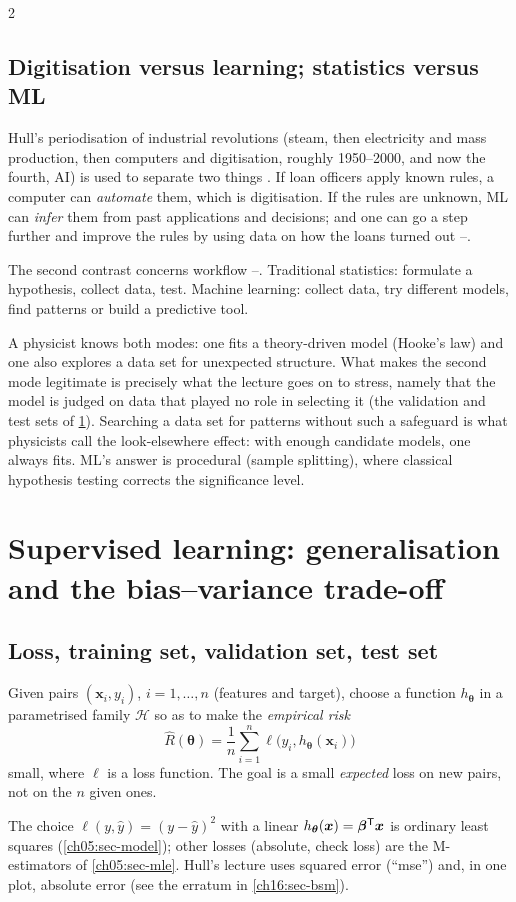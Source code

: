 \begin{paracol}{2}
\subsection{Digitisation versus learning; statistics versus ML}
Hull's periodisation of industrial revolutions (steam, then electricity and mass production, then computers and
digitisation, roughly 1950--2000, and now the fourth, AI) is used to separate two things . If loan officers
apply known rules, a computer can \emph{automate} them, which is digitisation. If the rules are unknown, ML can \emph{infer} them
from past applications and decisions; and one can go a step further and improve the rules by using data on how the loans
turned out --.

The second contrast concerns workflow --. Traditional statistics: formulate a hypothesis, collect data, test.
Machine learning: collect data, try different models, find patterns or build a predictive tool.
\begin{intuition}
A physicist knows both modes: one fits a theory-driven model (Hooke's law) and one also explores a data set for unexpected
structure. What makes the second mode legitimate is precisely what the lecture goes on to stress, namely that the
model is judged on data that played no role in selecting it (the validation and test sets of
\cref{ch16:sec-sup}). Searching a data set for patterns without such a safeguard is what physicists call the
look-elsewhere effect: with enough candidate models, one always fits. ML's answer is procedural (sample splitting),
where classical hypothesis testing corrects the significance level.
\end{intuition}

\section{Supervised learning: generalisation and the bias--variance trade-off}\label{ch16:sec-sup}
\subsection{Loss, training set, validation set, test set}
\begin{definition}\label{ch16:def-sup}
Given pairs $(\bm x_i,y_i)$, $i=1,\dots,n$ (features and target), choose a function $h_{\bm\theta}$ in a parametrised
family $\mathcal H$ so as to make the \emph{empirical risk}
\[
  \hat R(\bm\theta)=\frac1n\sum_{i=1}^n\ell\bigl(y_i,h_{\bm\theta}(\bm x_i)\bigr)
\]
small, where $\ell$ is a loss function. The goal is a small \emph{expected} loss on new pairs, not on the $n$ given ones.
\end{definition}
The choice $\ell(y,\hat y)=(y-\hat y)^2$ with a linear $h_{\bm\theta}(\bm x)=\bm\beta^{\mathsf T}\bm x$ is ordinary least squares
(\cref{ch05:sec-model}); other losses (absolute, check loss) are the M-estimators of \cref{ch05:sec-mle}. Hull's lecture
uses squared error (``mse'') and, in one plot, absolute error (see the erratum in \cref{ch16:sec-bsm}).


\end{paracol}
